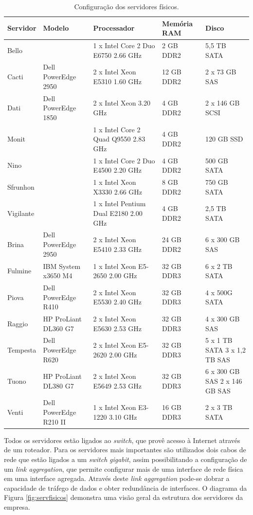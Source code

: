 \begin{table}[h!]
\caption{Configuração dos servidores físicos.}
\label{tab:servfisicos}
\begin{center}
\def\arraystretch{1}
\setlength{\tabcolsep}{0.15cm}
\begin{tabular}{|l|l|p{5.1cm}|l|p{2.1cm}|}\hline
\textbf{Servidor} & \textbf{Modelo} & \textbf{Processador} & \textbf{Memória \ac{RAM}} & \textbf{Disco} \\\hline
Bello & & 1 x Intel Core 2 Duo E6750 2.66 GHz & 2 GB DDR2 & 5,5 TB SATA\\\hline
Cacti & Dell PowerEdge 2950 & 2 x Intel Xeon E5310 1.60 GHz & 12 GB DDR2 & 2 x 73 GB SAS\\\hline
Dati & Dell PowerEdge 1850 & 2 x Intel Xeon 3.20 GHz & 4 GB DDR2 & 2 x 146 GB SCSI\\\hline
Monit & & 1 x Intel Core 2 Quad Q9550 2.83 GHz & 4 GB DDR2 & 120 GB SSD\\\hline
Nino & & 1 x Intel Core 2 Duo E4500 2.20 GHz & 4 GB DDR2 & 500 GB SATA\\\hline
Sfrunhon & & 1 x Intel Xeon X3330 2.66 GHz & 8 GB DDR2 & 750 GB SATA\\\hline
Vigilante & & 1 x Intel Pentium Dual E2180 2.00 GHz & 4 GB DDR2 & 2,5 TB SATA\\\hline
Brina & Dell PowerEdge 2950 & 2 x Intel Xeon E5410 2.33 GHz & 24 GB DDR2 & 6 x 300 GB SAS\\\hline
Fulmine & IBM System x3650 M4 & 1 x Intel Xeon E5-2650 2.00 GHz & 32 GB DDR3 & 6 x 2 TB SATA\\\hline
Piova & Dell PowerEdge R410 & 2 x Intel Xeon E5530 2.40 GHz & 32 GB DDR3 & 4 x 500G SATA\\\hline
Raggio & HP ProLiant DL360 G7 & 2 x  Intel Xeon E5630 2.53 GHz & 32 GB DDR3 & 4 x 300 GB SAS\\\hline
Tempesta & Dell PowerEdge R620 & 2 x Intel Xeon E5-2620 2.00 GHz & 32 GB DDR3 & 5 x 1 TB SATA 3 x 1,2 TB SAS\\\hline
Tuono & HP ProLiant DL380 G7 & 2 x Intel Xeon E5649 2.53 GHz & 32 GB DDR3 & 6 x 300 GB SAS 2 x 146 GB SAS\\\hline
Venti & Dell PowerEdge R210 II & 1 x Intel Xeon E3-1220 3.10 GHz & 16 GB DDR3 & 2 x 3 TB SATA\\\hline
\end{tabular}
\end{center}
\end{table}

Todos os servidores estão ligados ao \textit{switch}, que provê acesso à Internet através de um roteador. Para os servidores mais importantes 
são utilizados dois cabos de rede que estão ligados a um \textit{switch} \textit{gigabit}, assim possibilitando a configuração de um 
\textit{link aggregation}, que permite configurar mais de uma interface de rede física em uma interface agregada. Através deste 
\textit{link aggregation} pode-se dobrar a capacidade de tráfego de dados e obter redundância de interfaces. 
O diagrama da Figura \ref{fig:servfisicos} demonstra uma visão geral da estrutura dos servidores da empresa. 


